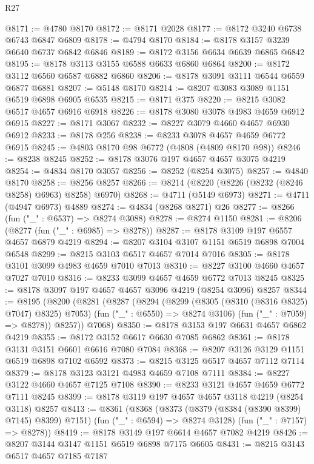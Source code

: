 \begin{lexlean}{R27}
\begin{coremodule}
@8171 := @4780 @8170
@8172 := @8171 @2028
@8177 := @8172 @3240 @6738 @6743 @6847 @6809
@8178 := @4794 @8170
@8184 := @8178 @3157 @3239 @6640 @6737 @6842 @6846
@8189 := @8172 @3156 @6634 @6639 @6865 @6842
@8195 := @8178 @3113 @3155 @6588 @6633 @6860 @6864
@8200 := @8172 @3112 @6560 @6587 @6882 @6860
@8206 := @8178 @3091 @3111 @6544 @6559 @6877 @6881
@8207 := @5148 @8170
@8214 := @8207 @3083 @3089 @1151 @6519 @6898 @6905 @6535
@8215 := @8171 @375
@8220 := @8215 @3082 @6517 @4657 @6916 @6918
@8226 := @8178 @3080 @3078 @4983 @4659 @6912 @6915
@8227 := @8171 @3067
@8232 := @8227 @3079 @4660 @4657 @6930 @6912
@8233 := @8178 @256
@8238 := @8233 @3078 @4657 @4659 @6772 @6915
@8245 := @4803 @8170 @98 @6772 (@4808 (@4809 @8170 @98))
@8246 := @8238 @8245
@8252 := @8178 @3076 @197 @4657 @4657 @3075 @4219
@8254 := @4834 @8170 @3057
@8256 := @8252 (@8254 @3075)
@8257 := @4840 @8170
@8258 := @8256 @8257
@8266 := @8214 (@8220 (@8226 (@8232 (@8246 @8258) @6963) @8258) @6970)
@8268 := @4711 (@5149 @6973)
@8271 := @4711 (@4947 @6973) @4889
@8274 := @4834 (@8268 @8271) @26
@8277 := @8266 (fun ("_" : @6537) => @8274 @3088)
@8278 := @8274 @1150
@8281 := @8206 (@8277 (fun ("_" : @6985) => @8278))
@8287 := @8178 @3109 @197 @6557 @4657 @6879 @4219
@8294 := @8207 @3104 @3107 @1151 @6519 @6898 @7004 @6548
@8299 := @8215 @3103 @6517 @4657 @7014 @7016
@8305 := @8178 @3101 @3099 @4983 @4659 @7010 @7013
@8310 := @8227 @3100 @4660 @4657 @7027 @7010
@8316 := @8233 @3099 @4657 @4659 @6772 @7013 @8245
@8325 := @8178 @3097 @197 @4657 @4657 @3096 @4219 (@8254 @3096) @8257
@8344 := @8195
    (@8200
      (@8281
        (@8287
          (@8294
            (@8299 (@8305 (@8310 (@8316 @8325) @7047) @8325) @7053)
            (fun ("_" : @6550) => @8274 @3106)
            (fun ("_" : @7059) => @8278))
          @8257))
      @7068)
@8350 := @8178 @3153 @197 @6631 @4657 @6862 @4219
@8355 := @8172 @3152 @6617 @6630 @7085 @6862
@8361 := @8178 @3131 @3151 @6601 @6616 @7080 @7084
@8368 := @8207 @3126 @3129 @1151 @6519 @6898 @7102 @6592
@8373 := @8215 @3125 @6517 @4657 @7112 @7114
@8379 := @8178 @3123 @3121 @4983 @4659 @7108 @7111
@8384 := @8227 @3122 @4660 @4657 @7125 @7108
@8390 := @8233 @3121 @4657 @4659 @6772 @7111 @8245
@8399 := @8178 @3119 @197 @4657 @4657 @3118 @4219 (@8254 @3118) @8257
@8413 := @8361
    (@8368
      (@8373 (@8379 (@8384 (@8390 @8399) @7145) @8399) @7151)
      (fun ("_" : @6594) => @8274 @3128)
      (fun ("_" : @7157) => @8278))
@8419 := @8178 @3149 @197 @6614 @4657 @7082 @4219
@8426 := @8207 @3144 @3147 @1151 @6519 @6898 @7175 @6605
@8431 := @8215 @3143 @6517 @4657 @7185 @7187

\end{coremodule}
\end{lexlean}

